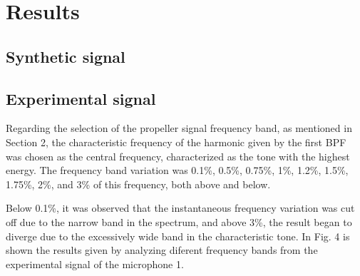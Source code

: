 \documentclass[10pt,fleqn,a4paper,twoside]{article}
\begin{document}
\section{Results}
\subsection{Synthetic signal}
\subsection{Experimental signal}
Regarding the selection of the propeller signal frequency band, as mentioned in Section 2, the characteristic frequency of the harmonic given by the first BPF was chosen as the central frequency, characterized as the tone with the highest energy. The frequency band variation was 0.1\%, 0.5\%, 0.75\%, 1\%, 1.2\%, 1.5\%, 1.75\%, 2\%, and 3\% of this frequency, both above and below.

Below 0.1\%, it was observed that the instantaneous frequency variation was cut off due to the narrow band in the spectrum, and above 3\%, the result began to diverge due to the excessively wide band in the characteristic tone. In Fig. 4 is shown the results given by analyzing diferent frequency bands from the experimental signal of the microphone 1.
\end{document}

